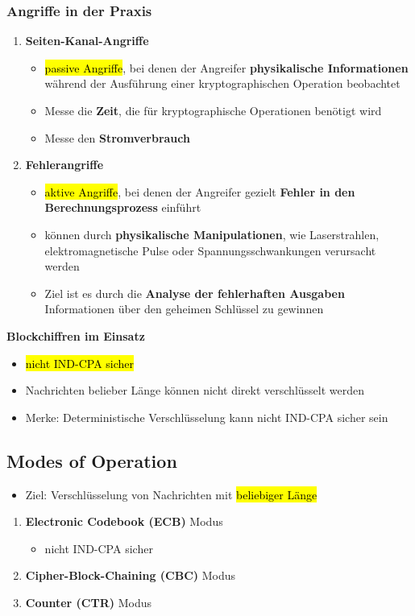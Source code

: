 \documentclass[a4paper, 10pt]{article}
\begin{document}
\subsubsection{Angriffe in der Praxis}
\begin{enumerate}
    \item \textbf{Seiten-Kanal-Angriffe}
    \begin{itemize}
        \item \hl{passive Angriffe}, bei denen der Angreifer \textbf{physikalische Informationen} während der Ausführung einer kryptographischen Operation beobachtet
        \item Messe die \textbf{Zeit}, die für kryptographische Operationen benötigt wird 
        \item Messe den \textbf{Stromverbrauch}
    \end{itemize}

    \item \textbf{Fehlerangriffe}
    \begin{itemize}
        \item \hl{aktive Angriffe}, bei denen der Angreifer gezielt \textbf{Fehler in den Berechnungsprozess} einführt
        \item können durch \textbf{physikalische Manipulationen}, wie Laserstrahlen, elektromagnetische Pulse oder Spannungsschwankungen verursacht werden
        \item Ziel ist es durch die \textbf{Analyse der fehlerhaften Ausgaben} Informationen über den geheimen Schlüssel zu gewinnen
    \end{itemize}
\end{enumerate}

\noindent\textbf{Blockchiffren im Einsatz}
\begin{itemize}
    \item \hl{nicht IND-CPA sicher}
    \item Nachrichten belieber Länge können nicht direkt verschlüsselt werden
    \item Merke: Deterministische Verschlüsselung kann nicht IND-CPA sicher sein
\end{itemize}


\subsection{Modes of Operation}
\begin{itemize}
    \item Ziel: Verschlüsselung von Nachrichten mit \hl{beliebiger Länge}
\end{itemize}
\begin{enumerate}
    \item \textbf{Electronic Codebook (ECB)} Modus
    \begin{itemize}
        \item nicht IND-CPA sicher
    \end{itemize}

        \item \textbf{Cipher-Block-Chaining (CBC)} Modus
        \item \textbf{Counter (CTR)} Modus
\end{enumerate}
\end{document}

